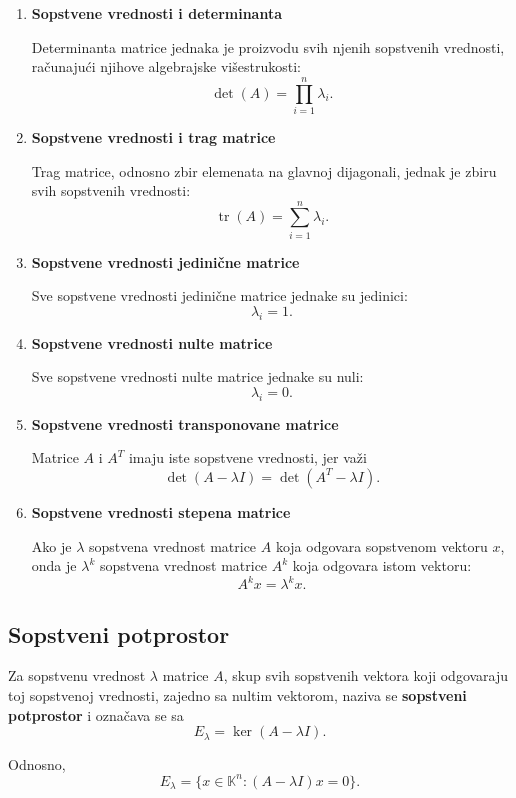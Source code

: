 \documentclass[12pt,a4paper]{report}
\begin{document}
\begin{enumerate}
	\item \textbf{Sopstvene vrednosti i determinanta}
	
	Determinanta matrice jednaka je proizvodu svih njenih
	sopstvenih vrednosti, računajući njihove algebrajske
	višestrukosti:
	\[
	\boxed{
		\det(A)=\prod_{i=1}^{n}\lambda_i.
	}
	\]
	
	\item \textbf{Sopstvene vrednosti i trag matrice}
	
	Trag matrice, odnosno zbir elemenata na glavnoj dijagonali,
	jednak je zbiru svih sopstvenih vrednosti:
	\[
	\boxed{
		\operatorname{tr}(A)=\sum_{i=1}^{n}\lambda_i.
	}
	\]
	
	\item \textbf{Sopstvene vrednosti jedinične matrice}
	
	Sve sopstvene vrednosti jedinične matrice jednake su jedinici:
	\[
	\lambda_i=1.
	\]
	
	\item \textbf{Sopstvene vrednosti nulte matrice}
	
	Sve sopstvene vrednosti nulte matrice jednake su nuli:
	\[
	\lambda_i=0.
	\]
	
	\item \textbf{Sopstvene vrednosti transponovane matrice}
	
	Matrice $A$ i $A^T$ imaju iste sopstvene vrednosti, jer važi
	\[
	\det(A-\lambda I)
	=
	\det(A^T-\lambda I).
	\]
	
	\item \textbf{Sopstvene vrednosti stepena matrice}
	
	Ako je $\lambda$ sopstvena vrednost matrice $A$ koja
	odgovara sopstvenom vektoru $x$, onda je $\lambda^k$
	sopstvena vrednost matrice $A^k$ koja odgovara istom vektoru:
	\[
	\boxed{
		A^kx=\lambda^kx.
	}
	\]
\end{enumerate}

\subsection{Sopstveni potprostor}


Za sopstvenu vrednost $\lambda$ matrice $A$, skup svih
sopstvenih vektora koji odgovaraju toj sopstvenoj vrednosti,
zajedno sa nultim vektorom, naziva se
\textbf{sopstveni potprostor} i označava se sa
\[
E_\lambda=\ker(A-\lambda I).
\]

Odnosno,
\[
\boxed{
	E_\lambda=
	\{x\in\mathbb{K}^n:(A-\lambda I)x=0\}.
}
\]
\end{document}
